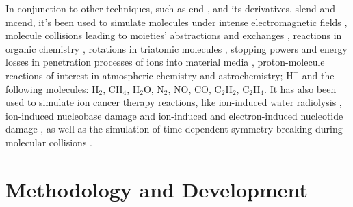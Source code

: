 \documentclass{aux/ttuthes2007}
\begin{document}
In conjunction to other techniques, such as \gls{end} , and its derivatives, \gls{slend} and \gls{mcend}, it's been used to simulate molecules under intense electromagnetic fields , molecule collisions leading to moieties' abstractions and exchanges , reactions in organic chemistry , rotations in triatomic molecules , 
stopping powers and energy losses in penetration processes of ions into material media ,
proton-molecule reactions of interest in atmospheric chemistry and astrochemistry; $\text{H}^+$ and the following molecules: $\text{H}_2$, C$\text{H}_4$, $\text{H}_2$O, $\text{N}_2$, NO, CO, $\text{C}_2$$\text{H}_2$, $\text{C}_2$$\text{H}_4$.
It has also been used to simulate ion cancer therapy reactions, like ion-induced water radiolysis , ion-induced nucleobase damage  and ion-induced and electron-induced nucleotide damage ,
as well as the simulation of time-dependent symmetry breaking during molecular collisions .

\chapter{\textbf{Methodology and Development}}\label{chap:methodology}
\end{document}
